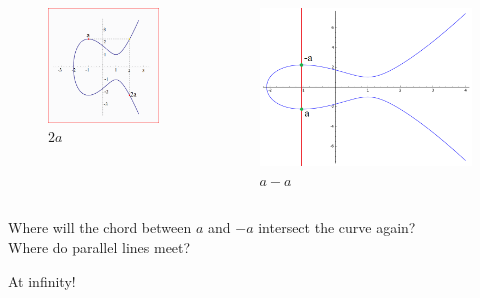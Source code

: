\documentclass[xcolor=pdftex,dvipsnames,table]{beamer}
\theoremstyle{plain}
\theoremstyle{definition}
\begin{document}
\begin{frame}
\begin{columns}
	\begin{figure}
		\centering
		\includegraphics[scale=.2]{p_plus_p.png}
		\caption{$2a$}
	\end{figure}
	\begin{figure}
		\centering
		\includegraphics[scale=.16]{p_minus_p.png}
		\caption{$a-a$}
	\end{figure}
	\end{columns}
\end{frame}

\begin{frame}
	\begin{center}
		\begin{Large}
		Where will the chord between $a$ and $-a$ intersect the curve again?\\[2em]
		\pause
		Where do parallel lines meet?\\[2em]
		\end{Large}
		\pause
		\begin{LARGE}
		At infinity!
		\end{LARGE}
	\end{center}
\end{frame}
\end{document}
